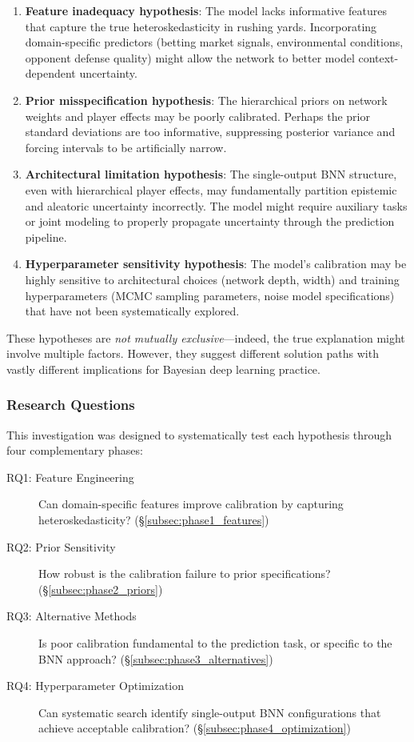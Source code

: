 \begin{enumerate}
    \item \textbf{Feature inadequacy hypothesis}: The model lacks informative features that capture the true heteroskedasticity in rushing yards. Incorporating domain-specific predictors (betting market signals, environmental conditions, opponent defense quality) might allow the network to better model context-dependent uncertainty.

    \item \textbf{Prior misspecification hypothesis}: The hierarchical priors on network weights and player effects may be poorly calibrated. Perhaps the prior standard deviations are too informative, suppressing posterior variance and forcing intervals to be artificially narrow.

    \item \textbf{Architectural limitation hypothesis}: The single-output BNN structure, even with hierarchical player effects, may fundamentally partition epistemic and aleatoric uncertainty incorrectly. The model might require auxiliary tasks or joint modeling to properly propagate uncertainty through the prediction pipeline.

    \item \textbf{Hyperparameter sensitivity hypothesis}: The model's calibration may be highly sensitive to architectural choices (network depth, width) and training hyperparameters (MCMC sampling parameters, noise model specifications) that have not been systematically explored.
\end{enumerate}

These hypotheses are \textit{not mutually exclusive}—indeed, the true explanation might involve multiple factors. However, they suggest different solution paths with vastly different implications for Bayesian deep learning practice.

\subsubsection{Research Questions}

This investigation was designed to systematically test each hypothesis through four complementary phases:

\begin{description}
    \item[RQ1: Feature Engineering] Can domain-specific features improve calibration by capturing heteroskedasticity? (\S\ref{subsec:phase1_features})

    \item[RQ2: Prior Sensitivity] How robust is the calibration failure to prior specifications? (\S\ref{subsec:phase2_priors})

    \item[RQ3: Alternative Methods] Is poor calibration fundamental to the prediction task, or specific to the BNN approach? (\S\ref{subsec:phase3_alternatives})

    \item[RQ4: Hyperparameter Optimization] Can systematic search identify single-output BNN configurations that achieve acceptable calibration? (\S\ref{subsec:phase4_optimization})
\end{description}

